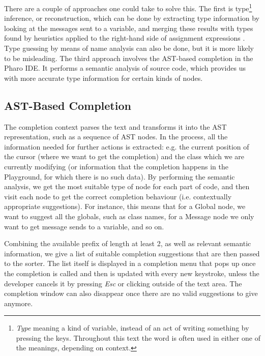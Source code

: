 \documentclass[sigplan,screen]{acmart}
\begin{document}
There are a couple of approaches one could take to solve this. The first is type\footnote{\textit{Type} meaning a kind of variable, instead of an act of writing something by pressing the keys. Throughout this text the word is often used in either one of the meanings, depending on context.} inference, or reconstruction, which can be done by extracting type information by looking at the messages sent to a variable, and merging these results with types found by heuristics applied to the right-hand side of assignment expressions \cite{Pluq09a}. Type guessing by means of name analysis can also be done, but it is more likely to be misleading. The third approach involves the AST-based completion in the Pharo IDE. It performs a semantic analysis of source code, which provides us with more accurate type information for certain kinds of nodes.

\subsection{AST-Based Completion}
The completion context parses the text and transforms it into the AST representation, such as a sequence of AST nodes. In the process, all the information needed for further actions is extracted: e.g. the current position of the cursor (where we want to get the completion) and the class which we are currently modifying (or information that the completion happens in the Playground, for which there is no such data). By performing the semantic analysis, we get the most suitable type of node for each part of code, and then visit each node to get the correct completion behaviour (i.e. contextually appropriate suggestions). For instance, this means that for a Global node, we want to suggest all the globals, such as class names, for a Message node we only want to get message sends to a variable, and so on.

Combining the available prefix of length at least 2, as well as relevant semantic information, we give a list of suitable completion suggestions that are then passed to the sorter. The list itself is displayed in a completion menu that pops up once the completion is called and then is updated with every new keystroke, unless the developer cancels it by pressing \textit{Esc} or clicking outside of the text area. The completion window can also disappear once there are no valid suggestions to give anymore.
\end{document}
